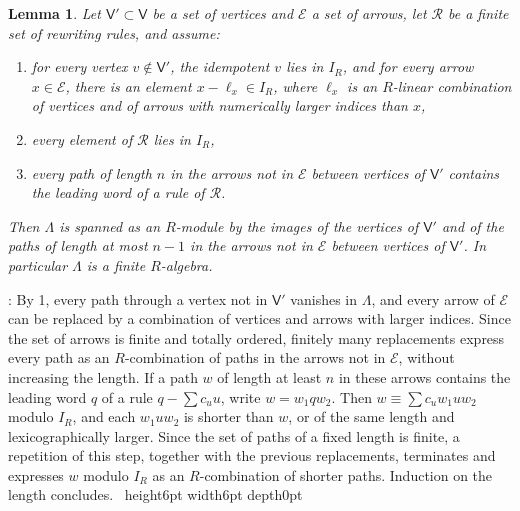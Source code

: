 \documentclass[leqno]{article}
\newcommand{\qed}{\hfill \vrule height6pt  width6pt depth0pt}
\newtheorem{lemma}[thm]{Lemma}
\newenvironment{proof}[1][]{\noindent {\it Proof #1} : }{\hbox{~}\qed
\smallskip
}
\numberwithin{equation}{section}
\begin{document}
\begin{lemma}
\label{zhu:lem:finiteness}
Let $\mathsf V' \subset \mathsf V$ be a set of vertices and $\mathcal E$ a set of arrows, let $\mathcal R$ be a finite set of rewriting rules, and assume:
\begin{enumerate}
\item for every vertex $v \notin \mathsf V'$, the idempotent $v$ lies in $I_R$, and for every arrow $x \in \mathcal E$, there is an element $x - \ell_x \in I_R$, where $\ell_x$ is an $R$-linear combination of vertices and of arrows with numerically larger indices than $x$,
\item every element of $\mathcal R$ lies in $I_R$,
\item every path of length $n$ in the arrows not in $\mathcal E$ between vertices of $\mathsf V'$ contains the leading word of a rule of $\mathcal R$.
\end{enumerate}
Then $\Lambda$ is spanned as an $R$-module by the images of the vertices of $\mathsf V'$ and of the paths of length at most $n - 1$ in the arrows not in $\mathcal E$ between vertices of $\mathsf V'$. In particular $\Lambda$ is a finite $R$-algebra.
\end{lemma}

\begin{proof}
By 1, every path through a vertex not in $\mathsf V'$ vanishes in $\Lambda$, and every arrow of $\mathcal E$ can be replaced by a combination of vertices and arrows with larger indices. Since the set of arrows is finite and totally ordered, finitely many replacements express every path as an $R$-combination of paths in the arrows not in $\mathcal E$, without increasing the length. If a path $w$ of length at least $n$ in these arrows contains the leading word $q$ of a rule $q - \sum c_u u$, write $w = w_1 q w_2$. Then $w \equiv \sum c_u w_1 u w_2$ modulo $I_R$, and each $w_1 u w_2$ is shorter than $w$, or of the same length and lexicographically larger. Since the set of paths of a fixed length is finite, a repetition of this step, together with the previous replacements, terminates and expresses $w$ modulo $I_R$ as an $R$-combination of shorter paths. Induction on the length concludes.
\end{proof}
\end{document}
